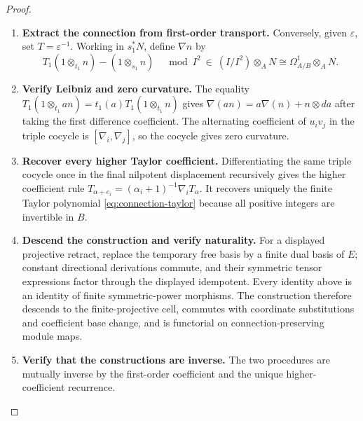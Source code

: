 \documentclass[11pt,a4paper]{article}
\numberwithin{algorithm}{section}
\numberwithin{equation}{section}
\theoremstyle{definition}
\theoremstyle{remark}
\theoremstyle{plain}
\theoremstyle{definition}
\theoremstyle{plain}
\begin{document}
\begin{proof}
\begin{enumerate}[leftmargin=*,align=left]
\item \textbf{Extract the connection from first-order transport.}
Conversely, given $\varepsilon$, set $T=\varepsilon^{-1}$.
Working in $s_1^*N$, define $\nabla n$ by
\[
 T_1(1\otimes_{t_1}n)-(1\otimes_{s_1}n)
 \quad\bmod I^2\ \in\ (I/I^2)\otimes_A N
  \cong\Omega^1_{A/B}\otimes_A N.
\]

\item \textbf{Verify Leibniz and zero curvature.}
The equality $T_1(1\otimes_{t_1}an)
=t_1(a)T_1(1\otimes_{t_1}n)$ gives
$\nabla(an)=a\nabla(n)+n\otimes da$ after taking the
first difference coefficient.  The alternating coefficient of
$u_iv_j$ in the triple cocycle is
$[\nabla_i,\nabla_j]$, so the cocycle gives zero curvature.

\item \textbf{Recover every higher Taylor coefficient.}
Differentiating the same triple cocycle once in the final
nilpotent displacement recursively gives the higher coefficient
rule $T_{\alpha+e_i}=(\alpha_i+1)^{-1}\nabla_iT_\alpha$.
It recovers uniquely the finite Taylor polynomial
\eqref{eq:connection-taylor} because all positive integers are
invertible in $B$.

\item \textbf{Descend the construction and verify naturality.}
For a displayed projective retract, replace the temporary free
basis by a finite dual basis of $E$; constant directional
derivations commute, and their symmetric tensor expressions
factor through the displayed idempotent.  Every identity above
is an identity of finite symmetric-power morphisms.  The
construction therefore descends to the finite-projective cell,
commutes with coordinate substitutions and coefficient base
change, and is functorial on connection-preserving module maps.

\item \textbf{Verify that the constructions are inverse.}
The two procedures are mutually inverse by the first-order
coefficient and the unique higher-coefficient recurrence.
\end{enumerate}
\end{proof}
\end{document}
